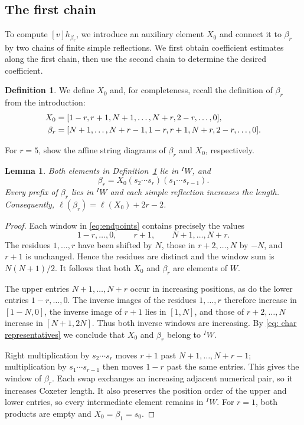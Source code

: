 \documentclass[11pt,a4paper,reqno]{amsart}
\numberwithin{equation}{section}
\newtheorem{lemma}[theorem]{Lemma}
\theoremstyle{definition}
\newtheorem{definition}[theorem]{Definition}
\theoremstyle{remark}
\theoremstyle{plain}
\newcommand{\David}[1]{\todo[color=green!15]{#1\hfill\textbf{Dv}}}
\begin{document}
\subsection{The first chain}\label{sec:first-chain}
To compute $[v]h_{\beta_r}$, we introduce an auxiliary element $X_0$
and connect it to $\beta_r$ by two chains of finite simple reflections.
We first obtain coefficient estimates along the first chain, then use
the second chain to determine the desired coefficient.

\begin{definition}\label{def:endpoints}
We define $X_0$ and, for completeness, recall the definition of $\beta_r$
from the introduction:
\begin{align}
 X_0&=[1-r,r+1,N+1,\ldots,N+r,2-r,\ldots,0],\notag\\
 \beta_r&=[N+1,\ldots,N+r-1,1-r,r+1,N+r,2-r,\ldots,0].
 \label{eq:endpoints}
\end{align}
\end{definition}

For $r=5$,  show the affine string diagrams of $\beta_r$ and $X_0$, respectively.


 


\begin{lemma}\label{lem:endpoints}
Both elements in Definition~\ref{def:endpoints} lie in $ {}^I W$, and
\[
 \beta_r=X_0(s_2\cdots s_r)(s_1\cdots s_{r-1}).
\]
Every prefix of $\beta_r$ lies in $ {}^I W$ and each simple reflection increases the length.
Consequently, $\ell(\beta_r)=\ell(X_0)+2r-2$.
\end{lemma}
\begin{proof}
Each  window in \eqref{eq:endpoints} contains precisely the values
\[
 1-r,\ldots,0,\qquad r+1,\qquad N+1,\ldots,N+r.
\]
The residues $1,\ldots,r$ have been shifted by $N$, those in
$r+2,\ldots,N$ by $-N$, and $r+1$ is unchanged. Hence the residues
are distinct and the window sum is $N(N+1)/2$.
It follows that both $X_0$ and $\beta_r$ are elements of $W$. 

The upper entries $N+1,\ldots,N+r$ occur in increasing positions,
as do the lower entries $1-r,\ldots,0$. The inverse images of the
residues $1,\ldots,r$ therefore increase in $[1-N,0]$, the inverse
image of $r+1$ lies in $[1,N]$, and those of $r+2,\ldots,N$ increase
in $[N+1,2N]$. Thus both inverse windows are increasing.
By \eqref{eq: char representatives} we conclude that $X_0$ and $\beta_r$ belong to ${}^IW$. 

Right multiplication by $s_2\cdots s_r$ moves $r+1$ past
$N+1,\ldots,N+r-1$; multiplication by $s_1\cdots s_{r-1}$ then
moves $1-r$ past the same entries. This gives the window of $\beta_r$.
Each swap exchanges an increasing adjacent numerical pair, so it
increases Coxeter length. %
 It also preserves the position order of
the upper and lower entries, so every intermediate element remains
in $ {}^I W$. For $r=1$, both products are empty and
$X_0=\beta_1=s_0$.
\end{proof}
\end{document}
